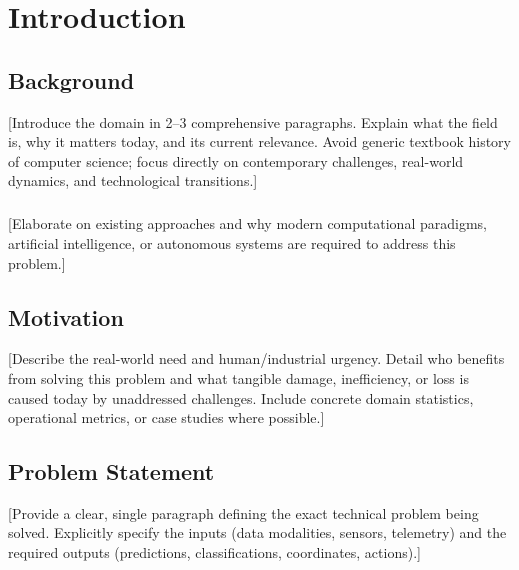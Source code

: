 \chapter{Introduction}

\section{Background}
[Introduce the domain in 2--3 comprehensive paragraphs. Explain what the field is, why it matters today, and its current relevance. Avoid generic textbook history of computer science; focus directly on contemporary challenges, real-world dynamics, and technological transitions.]

\paragraph{}[Elaborate on existing approaches and why modern computational paradigms, artificial intelligence, or autonomous systems are required to address this problem.]

\section{Motivation}
[Describe the real-world need and human/industrial urgency. Detail who benefits from solving this problem and what tangible damage, inefficiency, or loss is caused today by unaddressed challenges. Include concrete domain statistics, operational metrics, or case studies where possible.]

\section{Problem Statement}
[Provide a clear, single paragraph defining the exact technical problem being solved. Explicitly specify the inputs (data modalities, sensors, telemetry) and the required outputs (predictions, classifications, coordinates, actions).]

